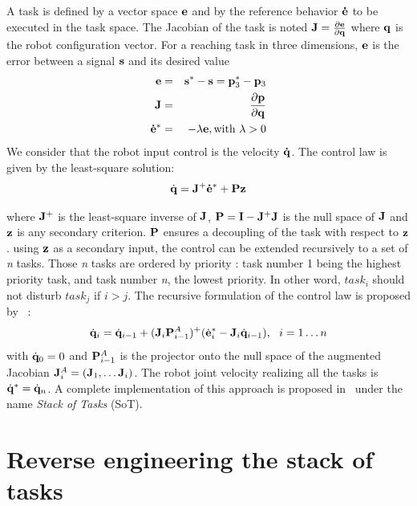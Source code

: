 \documentclass[letterpaper, 10pt, conference]{ieeeconf}      %
\begin{document}
A task is defined by a vector space 
${\mathbf{e}}$ and by the reference behavior ${\mathbf{\dot{e}}}$ to be
executed in the task space. The Jacobian of the task is noted
${\mathbf{J}}=\frac{\partial{{\mathbf{e}}}}{\partial{{\mathbf{q}}}}$ where ${\mathbf{q}}$ is the robot
configuration vector. 
For a reaching task in three dimensions, ${\mathbf{e}}$ is the error 
between a signal ${\mathbf{s}}$ and its desired value
\begin{eqnarray*}
  {\mathbf{e}} & = & {\mathbf{s}}^* - {\mathbf{s}} = {\mathbf{p}}_3^* - {\mathbf{p}}_3\\
  {\mathbf{J}} & = & \frac{\partial{{\mathbf{p}}}}{\partial{{\mathbf{q}}}}\\
  {\mathbf{\dot{e}}}^* & = & -\lambda {\mathbf{e}}, \text{with } \lambda>0
\end{eqnarray*}
We consider that the robot input control is the velocity
${\mathbf{\dot{q}}}$.  The control law is given by the least-square solution:
\begin{equation}
\dot{{\mathbf{q}}} = {\mathbf{J}}^+ {\mathbf{\dot{e}}}^* + {\mathbf{P}}{\mathbf{z}}
\end{equation}

\noindent where ${\mathbf{J}}^+$ is the least-square inverse of ${\mathbf{J}}$,
${\mathbf{P}} = {\mathbf{I}} - {\mathbf{J}}^+ {\mathbf{J}}$ is the null space
of ${\mathbf{J}}$ and ${\mathbf{z}}$ is any secondary criterion. ${\mathbf{P}}$ ensures
a decoupling of the task with respect to ${\mathbf{z}}$. 
using ${\mathbf{z}}$ as a secondary input, the control can be extended
recursively to a set of \emph{n} tasks. Those \emph{n} tasks
are ordered by priority : task number 1 being the highest priority task,
and task number \emph{n}, the lowest priority.
In other word, $task_i$ should not disturb $task_j$ if $i>j$.
The recursive formulation of the control law is proposed by~\cite{siciliano91} :
\begin{equation}
\dot{{\mathbf{q}}}_i = \dot{{\mathbf{q}}}_{i-1} + ({\mathbf{J}}_i {\mathbf{P}}_{i-1}^{A})^+
(\dot{{\mathbf{e}}}^*_i - {\mathbf{J}}_i \dot{{\mathbf{q}}}_{i-1}) , \ \ i = 1 \ldots n
\end{equation}
\noindent with $\dot{{\mathbf{q}}}_0 = 0$ and ${\mathbf{P}}_{i-1}^{A}$ is
the projector onto the null space of the augmented Jacobian
${\mathbf{J}}_i^A = ({\mathbf{J}}_1, \ldots {\mathbf{J}}_i)$. The robot
joint velocity realizing all the tasks is $\dot{{\mathbf{q}}}^* = \dot{{\mathbf{q}}}_n$.
A complete implementation of this approach is proposed in~\cite{mansard07} under the
name \emph{Stack of Tasks} (SoT). 

\section{Reverse engineering the stack of tasks} \label{sec:detect}
\label{section:algorithm}
\end{document}
